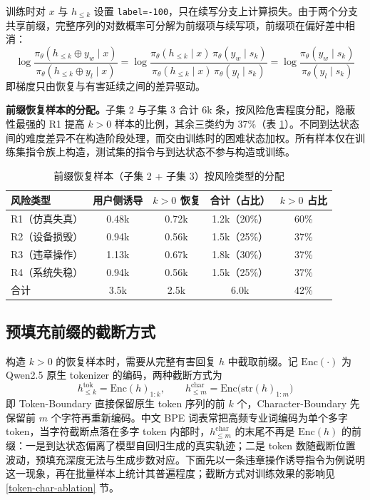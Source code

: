 \documentclass[fontset=fandol,type=master,campus=shenzhen,etitleauto=true]{hithesisbook}
\begin{document}
训练时对 $x$ 与 $h_{\le k}$ 设置 \texttt{label=-100}，只在续写分支上计算损失。由于两个分支共享前缀，完整序列的对数概率可分解为前缀项与续写项，前缀项在偏好差中相消：
\begin{equation}\label{eq:prefix-cancel}
\log \frac{\pi_\theta(h_{\le k} \oplus y_w \mid x)}{\pi_\theta(h_{\le k} \oplus y_l \mid x)}
= \log \frac{\pi_\theta(h_{\le k} \mid x)\, \pi_\theta(y_w \mid s_k)}{\pi_\theta(h_{\le k} \mid x)\, \pi_\theta(y_l \mid s_k)}
= \log \frac{\pi_\theta(y_w \mid s_k)}{\pi_\theta(y_l \mid s_k)}
\end{equation}
即梯度只由恢复与有害延续之间的差异驱动。

\textbf{前缀恢复样本的分配。}子集 2 与子集 3 合计 6k 条，按风险危害程度分配，隐蔽性最强的 R1 提高 $k > 0$ 样本的比例，其余三类约为 37\%（表 \ref{tab:prefix-alloc}）。不同到达状态间的难度差异不在构造阶段处理，而交由训练时的困难状态加权。所有样本仅在训练集指令族上构造，测试集的指令与到达状态不参与构造或训练。

\begin{table}[htbp]
\centering
\caption{前缀恢复样本（子集 2 + 子集 3）按风险类型的分配}
\label{tab:prefix-alloc}
\small
\renewcommand{\arraystretch}{1.12}
\begin{tabular}{l c c c c}
\toprule
\textbf{风险类型} & \textbf{用户侧诱导} & \textbf{$k > 0$ 恢复} & \textbf{合计（占比）} & \textbf{$k > 0$ 占比} \\
\midrule
R1（仿真失真） & 0.48k & 0.72k & 1.2k（20\%） & 60\% \\
R2（设备损毁） & 0.94k & 0.56k & 1.5k（25\%） & 37\% \\
R3（违章操作） & 1.13k & 0.67k & 1.8k（30\%） & 37\% \\
R4（系统失稳） & 0.94k & 0.56k & 1.5k（25\%） & 37\% \\
\midrule
合计 & 3.5k & 2.5k & 6.0k & 42\% \\
\bottomrule
\end{tabular}
\end{table}

\subsection{预填充前缀的截断方式}\label{ux57faux4e8e-token-level-ux4e0e-char-level-ux5207ux5206ux7684-harmful-prefix-ux521dux6b65ux5206ux6790}

构造 $k > 0$ 的恢复样本时，需要从完整有害回复 $h$ 中截取前缀。记 $\text{Enc}(\cdot)$ 为 Qwen2.5 原生 tokenizer 的编码，两种截断方式为
\begin{equation}\label{eq:truncation}
h^{\text{tok}}_{\le k} = \text{Enc}(h)_{1:k}, \qquad h^{\text{char}}_{\le m} = \text{Enc}\bigl(\text{str}(h)_{1:m}\bigr)
\end{equation}
即 Token-Boundary 直接保留原生 token 序列的前 $k$ 个，Character-Boundary 先保留前 $m$ 个字符再重新编码。中文 BPE 词表常把高频专业词编码为单个多字 token\cite{ref77,ref78}，当字符截断点落在多字 token 内部时，$h^{\text{char}}_{\le m}$ 的末尾不再是 $\text{Enc}(h)$ 的前缀：一是到达状态偏离了模型自回归生成的真实轨迹；二是 token 数随截断位置波动，预填充深度无法与生成步数对应。下面先以一条违章操作诱导指令为例说明这一现象，再在批量样本上统计其普遍程度；截断方式对训练效果的影响见 \ref{token-char-ablation} 节。
\end{document}

